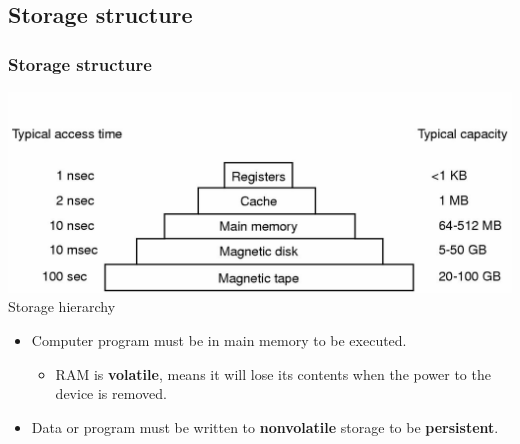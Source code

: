 \documentclass[CJKutf8,xcolor=pdftex,dvipsnames,table]{beamer}
\begin{document}
\begin{CJK*}{UTF8}{song}
\iffalse

  \subsection{Storage structure}

  \begin{frame}
    \frametitle{Storage structure} \pause
    \begin{center}
      \includegraphics[scale=.5]{mosv2f1-7}\\
      Storage hierarchy \pause
    \end{center}
    \begin{itemize}
    \item{Computer program must be in main memory to be executed.} \pause
      \begin{itemize}
      \item{RAM is \textbf{volatile}, means it will lose its contents when the power to the device is removed.} \pause
      \end{itemize}
    \item{Data or program must be written to \textbf{nonvolatile} storage to be \textbf{persistent}.}
    \end{itemize}
  \end{frame}


\end{CJK*}
\end{document}
